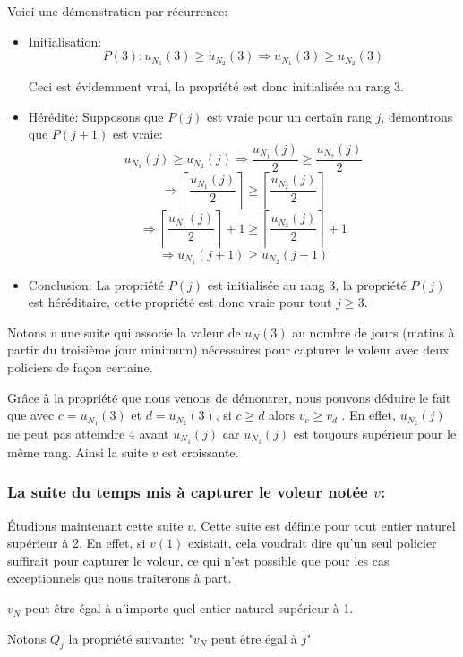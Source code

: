 Voici une démonstration par récurrence:
\begin{itemize}
    \item{Initialisation:} $$P(3): u_{N_1}(3)\geq u_{N_2}(3)\Rightarrow u_{N_1}(3)\geq u_{N_2}(3)$$
    
    Ceci est évidemment vrai, la propriété est donc initialisée au rang 3.
    \item{Hérédité:} Supposons que $P(j)$ est vraie pour un certain rang $j$, démontrons que $P(j+1)$ est vraie:
    $$u_{N_1}(j)\geq u_{N_2}(j)\Rightarrow \dfrac{u_{N_1}(j)}{2}\geq\dfrac{u_{N_2}(j)}{2}$$
    $$\Rightarrow \left\lceil{\dfrac{u_{N_1}(j)}{2}}\right\rceil\geq\left\lceil{\dfrac{u_{N_2}(j)}{2}}\right\rceil$$
    $$\Rightarrow \left\lceil{\dfrac{u_{N_1}(j)}{2}}\right\rceil+1\geq\left\lceil{\dfrac{u_{N_2}(j)}{2}}\right\rceil+1$$
    $$\Rightarrow u_{N_1}(j+1)\geq u_{N_2}(j+1)$$
    \item{Conclusion:}
    La propriété $P(j)$ est initialisée au rang $3$, la propriété $P(j)$ est héréditaire, cette propriété est donc vraie pour tout $j\geq 3$.
\end{itemize}

Notons $v$ une suite qui associe la valeur de $u_N(3)$ au nombre de jours (matins à partir du troisième jour minimum) nécessaires pour capturer le voleur avec deux policiers de façon certaine.

Grâce à la propriété que nous venons de démontrer, nous pouvons déduire le fait que avec $c=u_{N_1}(3)$ et $d=u_{N_2}(3)$, si $c\geq d$ alors $v_c\geq v_d$ . En effet, $u_{N_2}(j)$ ne peut pas atteindre 4 avant $u_{N_1}(j)$ car $u_{N_1}(j)$ est toujours supérieur pour le même rang. Ainsi la suite $v$ est croissante.

\subsubsection{La suite du temps mis à capturer le voleur notée $v$:}

Étudions maintenant cette suite $v$. Cette suite est définie pour tout entier naturel supérieur à 2. En effet, si $v(1)$ existait, cela voudrait dire qu'un seul policier suffirait pour capturer le voleur, ce qui n'est possible que pour les cas exceptionnels que nous traiterons à part. 

$v_N$ peut être égal à n'importe quel entier naturel supérieur à 1. 

Notons $Q_{j}$ la propriété suivante: "$v_N$ peut être égal à $j$"


